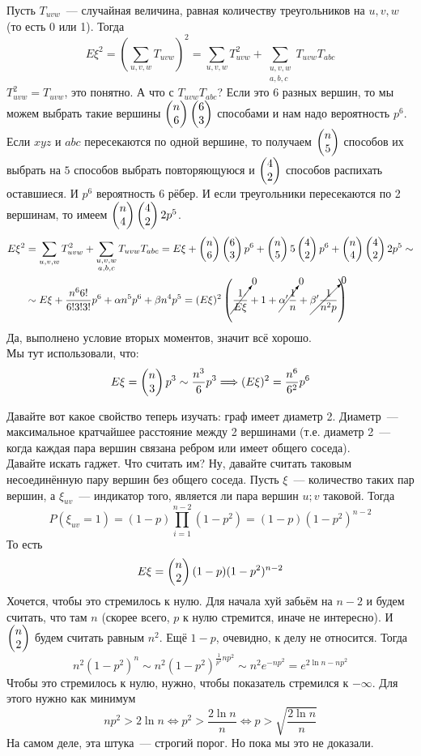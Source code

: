 \documentclass{article}
\begin{document}
    \begin{example}
        Пусть $T_{uvw}$~--- случайная величина, равная количеству треугольников на $u,v,w$ (то есть 0 или 1). Тогда
        $$
        E\xi^2=\left(\sum\limits_{u,v,w}T_{uvw}\right)^2=\sum\limits_{u,v,w}T_{uvw}^2+\sum\limits_{\substack{u,v,w\\a,b,c}}T_{uvw}T_{abc}
        $$
        $T_{uvw}^2=T_{uvw}$, это понятно. А что с $T_{uvw}T_{abc}$? Если это 6 разных вершин, то мы можем выбрать такие вершины $\left(\begin{matrix}n\\6\end{matrix}\right)\left(\begin{matrix}6\\3\end{matrix}\right)$ способами и нам надо вероятность $p^6$. Если $xyz$ и $abc$ пересекаются по одной вершине, то получаем $\left(\begin{matrix}n\\5\end{matrix}\right)$ способов их выбрать на $5$ способов выбрать повторяющуюся и $\left(\begin{matrix}4\\2\end{matrix}\right)$ способов распихать оставшиеся. И $p^6$ вероятность 6 рёбер. И если треугольники пересекаются по 2 вершинам, то имеем $\left(\begin{matrix}n\\4\end{matrix}\right)\left(\begin{matrix}4\\2\end{matrix}\right) 2p^5$.
        \[\begin{split}
            E\xi^2&=\sum\limits_{u,v,w}T_{uvw}^2+\sum\limits_{\substack{u,v,w\\a,b,c}}T_{uvw}T_{abc}=
            E\xi+\left(\begin{matrix}n\\6\end{matrix}\right)\left(\begin{matrix}6\\3\end{matrix}\right)p^6+\left(\begin{matrix}n\\5\end{matrix}\right)5\left(\begin{matrix}4\\2\end{matrix}\right)p^6+\left(\begin{matrix}n\\4\end{matrix}\right)\left(\begin{matrix}4\\2\end{matrix}\right) 2p^5\sim\\
            &\sim E\xi+\frac{n^66!}{6!3!3!}p^6+\alpha n^5p^6+\beta n^4p^5=(E\xi)^2\left(\cancelto0{\frac1{E\xi}}+1+\cancelto0{\alpha'\frac1n}+\cancelto0{\beta'\frac1{n^2p}}\right)
        \end{split}\]
        Да, выполнено условие вторых моментов, значит всё хорошо.\\
        Мы тут использовали, что:
        $$
        E\xi=\left(\begin{matrix}n\\3\end{matrix}\right)p^3\sim\frac{n^3}6p^3\Longrightarrow(E\xi)^2=\frac{n^6}{6^2}p^6
        $$
    \end{example}
    \begin{example}
        Давайте вот какое свойство теперь изучать: граф имеет диаметр 2. Диаметр~--- максимальное кратчайшее расстояние между 2 вершинами (т.е. диаметр 2~--- когда каждая пара вершин связана ребром или имеет общего соседа).\\
        Давайте искать гаджет. Что считать им? Ну, давайте считать таковым несоединённую пару вершин без общего соседа. Пусть $\xi$~--- количество таких пар вершин, а $\xi_{uv}$~--- индикатор того, является ли пара вершин ${u;v}$ таковой. Тогда
        $$
        P(\xi_{uv}=1)=(1-p)\prod\limits_{i=1}^{n-2}(1-p^2)=(1-p)(1-p^2)^{n-2}
        $$
        То есть
        $$
        E\xi=\left(\begin{matrix}n\\2\end{matrix}\right)(1-p)(1-p^2)^{n-2}
        $$
        Хочется, чтобы это стремилось к нулю. Для начала хуй забьём на $n-2$ и будем считать, что там $n$ (скорее всего, $p$ к нулю стремится, иначе не интересно). И $\left(\begin{matrix}n\\2\end{matrix}\right)$ будем считать равным $n^2$. Ещё $1-p$, очевидно, к делу не относится. Тогда
        $$
        n^2(1-p^2)^n\sim n^2\left(1-p^2\right)^{\frac1{p^2}np^2}\sim n^2e^{-np^2}=e^{2\ln n-np^2}
        $$
        Чтобы это стремилось к нулю, нужно, чтобы показатель стремился к $-\infty$. Для этого нужно как минимум
        $$
        np^2>2\ln n\Leftrightarrow p^2>\frac{2\ln n}n\Leftrightarrow p>\sqrt{\frac{2\ln n}n}
        $$
        На самом деле, эта штука~--- строгий порог. Но пока мы это не доказали.
    \end{example}
\end{document}
